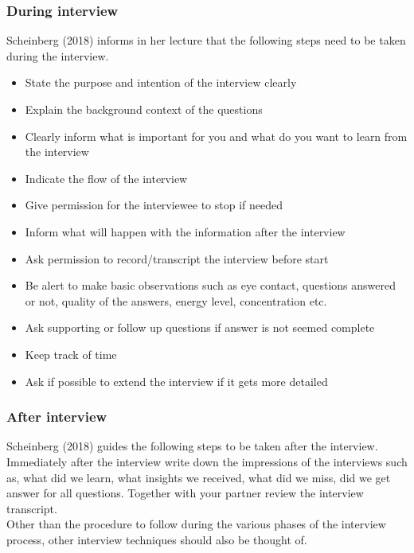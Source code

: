 \subsubsection{During interview}
Scheinberg (2018) informs in her lecture that the following steps need to be taken during the interview.\\

\begin{itemize}
    \item State the purpose and intention of the interview clearly 
    \item Explain the background context of the questions
    \item Clearly inform what is important for you and what do you want to learn from the interview
    \item Indicate the flow of the interview
    \item Give permission for the interviewee to stop if needed
    \item Inform what will happen with the information after the interview
    \item Ask permission to record/transcript the interview before start
    \item Be alert to make basic observations such as eye contact, questions answered or not, quality of the answers, energy level, concentration etc.
    \item Ask supporting or follow up questions if answer is not seemed complete
    \item Keep track of time
    \item Ask if possible to extend the interview if it gets more detailed\\
\end{itemize}

\subsubsection{After interview}
Scheinberg (2018) guides the following steps to be taken after the interview.
Immediately after the interview write down the impressions of the interviews such as, what did we learn, what insights we received, what did we miss, did we get answer for all questions. Together with your partner review the interview transcript.\\

Other than the procedure to follow during the various phases of the interview process, other interview techniques should also be thought of.\\

